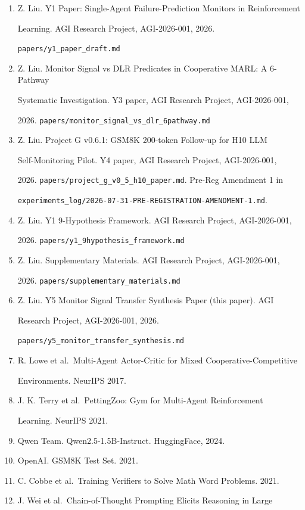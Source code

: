 \documentclass[
]{article}
\begin{document}
\begin{enumerate}
\def\labelenumi{\arabic{enumi}.}
\item
  Z. Liu. Y1 Paper: Single-Agent Failure-Prediction Monitors in
  Reinforcement

  Learning. AGI Research Project, AGI-2026-001, 2026.

  \texttt{papers/y1\_paper\_draft.md}
\item
  Z. Liu. Monitor Signal vs DLR Predicates in Cooperative MARL: A
  6-Pathway

  Systematic Investigation. Y3 paper, AGI Research Project,
  AGI-2026-001,

  2026. \texttt{papers/monitor\_signal\_vs\_dlr\_6pathway.md}
\item
  Z. Liu. Project G v0.6.1: GSM8K 200-token Follow-up for H10 LLM

  Self-Monitoring Pilot. Y4 paper, AGI Research Project, AGI-2026-001,

  2026. \texttt{papers/project\_g\_v0\_5\_h10\_paper.md}. Pre-Reg
  Amendment 1 in

  \texttt{experiments\_log/2026-07-31-PRE-REGISTRATION-AMENDMENT-1.md}.
\item
  Z. Liu. Y1 9-Hypothesis Framework. AGI Research Project, AGI-2026-001,

  2026. \texttt{papers/y1\_9hypothesis\_framework.md}
\item
  Z. Liu. Supplementary Materials. AGI Research Project, AGI-2026-001,

  2026. \texttt{papers/supplementary\_materials.md}
\item
  Z. Liu. Y5 Monitor Signal Transfer Synthesis Paper (this paper). AGI

  Research Project, AGI-2026-001, 2026.

  \texttt{papers/y5\_monitor\_transfer\_synthesis.md}
\item
  R. Lowe et al.~Multi-Agent Actor-Critic for Mixed
  Cooperative-Competitive

  Environments. NeurIPS 2017.
\item
  J. K. Terry et al.~PettingZoo: Gym for Multi-Agent Reinforcement

  Learning. NeurIPS 2021.
\item
  Qwen Team. Qwen2.5-1.5B-Instruct. HuggingFace, 2024.
\item
  OpenAI. GSM8K Test Set. 2021.
\item
  C. Cobbe et al.~Training Verifiers to Solve Math Word Problems. 2021.
\item
  J. Wei et al.~Chain-of-Thought Prompting Elicits Reasoning in Large


\end{enumerate}
\end{document}
